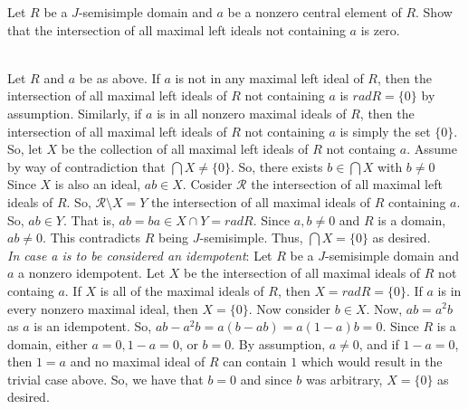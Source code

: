 Let $R$ be a $J$-semisimple domain and $a$ be a nonzero central element of $R$. Show that the
intersection of all maximal left ideals not containing $a$ is zero.\\

\begin{solution}\renewcommand{\qedsymbol}{}\ \\
    Let $R$ and $a$ be as above. If $a$ is not in any maximal left ideal of $R$, then the intersection
    of all maximal left ideals of $R$ not containing $a$ is $rad R=\{0\}$ by assumption. Similarly, if
    $a$ is in all nonzero maximal ideals of $R$, then the intersection of all maximal left ideals of $R$
    not containing $a$ is simply the set $\{0\}$. So, let $X$ be the collection of all maximal left
    ideals of $R$ not containg $a$. Assume by way of contradiction that $\bigcap X\neq\{0\}$. So, there
    exists $b\in\bigcap X$ with $b\neq0$ Since $X$ is also an ideal, $ab\in X$. Cosider $\mathcal{R}$
    the intersection of all maximal left ideals of $R$. So, $\mathcal{R}\setminus X=Y$ the intersection
    of all maximal ideals of $R$ containing $a$. So, $ab\in Y$. That is, $ab=ba\in X\cap Y=rad R$. Since
    $a,b\neq0$ and $R$ is a domain, $ab\neq0$. This contradicts $R$ being $J$-semisimple. Thus,
    $\bigcap X=\{0\}$ as desired. \\

    \textit{In case a is to be considered an idempotent}: Let $R$ be a $J$-semisimple domain and $a$ a
    nonzero idempotent. Let $X$ be the intersection of all maximal ideals of $R$ not containg $a$. If
    $X$ is all of the maximal ideals of $R$, then $X=rad R=\{0\}$. If $a$ is in every nonzero maximal
    ideal, then $X=\{0\}$. Now consider $b\in X$. Now, $ab=a^2b$ as $a$ is an idempotent. So,
    $ab-a^2b=a(b-ab)=a(1-a)b=0$. Since $R$ is a domain, either $a=0, 1-a=0$, or $b=0$. By assumption,
    $a\neq0$, and if $1-a=0$, then $1=a$ and no maximal ideal of $R$ can contain $1$ which would result
    in the trivial case above. So, we have that $b=0$ and since $b$ was arbitrary, $X=\{0\}$ as desired.

\end{solution}